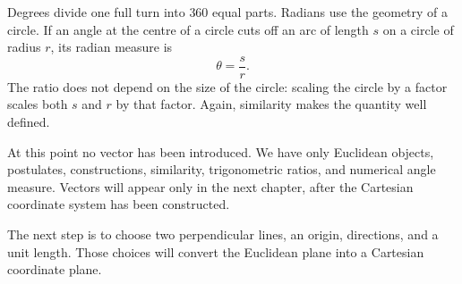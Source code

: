Degrees divide one full turn into $360$ equal parts. Radians use the geometry
of a circle. If an angle at the centre of a circle cuts off an arc of length
$s$ on a circle of radius $r$, its radian measure is
\[
\theta=\frac{s}{r}.
\]
The ratio does not depend on the size of the circle: scaling the circle by a
factor scales both $s$ and $r$ by that factor. Again, similarity makes the
quantity well defined.

\begin{remarkbox}
At this point no vector has been introduced. We have only Euclidean objects,
postulates, constructions, similarity, trigonometric ratios, and numerical
angle measure. Vectors will appear only in the next chapter, after the
Cartesian coordinate system has been constructed.
\end{remarkbox}

The next step is to choose two perpendicular lines, an origin, directions, and
a unit length. Those choices will convert the Euclidean plane into a Cartesian
coordinate plane.